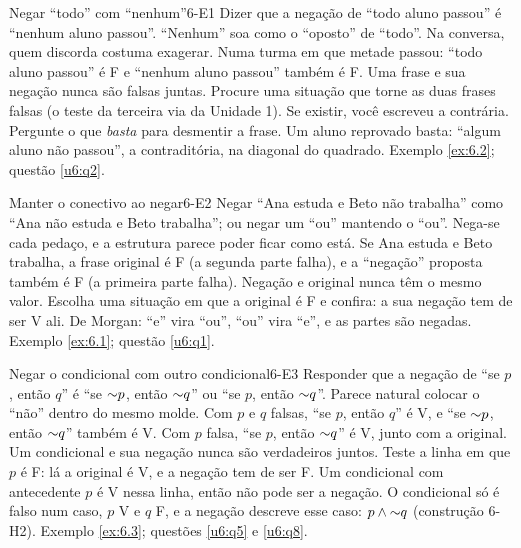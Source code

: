 \ErrosComuns

\begin{erro}{Negar \enquote{todo} com \enquote{nenhum}}{6-E1}
 Dizer que a negação de \enquote{todo aluno passou} é \enquote{nenhum aluno passou}.
 \enquote{Nenhum} soa como o \enquote{oposto} de \enquote{todo}. Na conversa, quem discorda costuma exagerar.
 Numa turma em que metade passou: \enquote{todo aluno passou} é F e \enquote{nenhum aluno passou} também é F. Uma frase e sua negação nunca são falsas juntas.
 Procure uma situação que torne as duas frases falsas (o teste da terceira via da Unidade 1). Se existir, você escreveu a contrária.
 Pergunte o que \emph{basta} para desmentir a frase. Um aluno reprovado basta: \enquote{algum aluno não passou}, a contraditória, na diagonal do quadrado.
 Exemplo \ref{ex:6.2}; questão \ref{u6:q2}.
\end{erro}

\begin{erro}{Manter o conectivo ao negar}{6-E2}
 Negar \enquote{Ana estuda e Beto não trabalha} como \enquote{Ana não estuda e Beto trabalha}; ou negar um \enquote{ou} mantendo o \enquote{ou}.
 Nega-se cada pedaço, e a estrutura parece poder ficar como está.
 Se Ana estuda e Beto trabalha, a frase original é F (a segunda parte falha), e a \enquote{negação} proposta também é F (a primeira parte falha). Negação e original nunca têm o mesmo valor.
 Escolha uma situação em que a original é F e confira: a sua negação tem de ser V ali.
 De Morgan: \enquote{e} vira \enquote{ou}, \enquote{ou} vira \enquote{e}, e as partes são negadas.
 Exemplo \ref{ex:6.1}; questão \ref{u6:q1}.
\end{erro}

\begin{erro}{Negar o condicional com outro condicional}{6-E3}
 Responder que a negação de \enquote{se $p$, então $q$} é \enquote{se ${{\sim}}p$, então ${{\sim}}q$} ou \enquote{se $p$, então ${{\sim}}q$}.
 Parece natural colocar o \enquote{não} dentro do mesmo molde.
 Com $p$ e $q$ falsas, \enquote{se $p$, então $q$} é V, e \enquote{se ${{\sim}}p$, então ${{\sim}}q$} também é V. Com $p$ falsa, \enquote{se $p$, então ${{\sim}}q$} é V, junto com a original. Um condicional e sua negação nunca são verdadeiros juntos.
 Teste a linha em que $p$ é F: lá a original é V, e a negação tem de ser F. Um condicional com antecedente $p$ é V nessa linha, então não pode ser a negação.
 O condicional só é falso num caso, $p$ V e $q$ F, e a negação descreve esse caso: $p\wedge{{\sim}}q$ (construção 6-H2).
 Exemplo \ref{ex:6.3}; questões \ref{u6:q5} e \ref{u6:q8}.
\end{erro}

